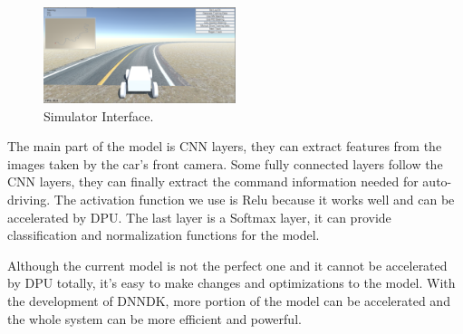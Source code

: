 \documentclass[conference]{IEEEtran}
\begin{document}
\begin{figure}[htbp]
\centerline{\includegraphics[width=0.5\textwidth]{simulator.png}}
\caption{Simulator Interface.}
\label{si}
\end{figure}

The main part of the model is CNN layers, they can extract features from the images taken by the car's front camera. Some fully connected layers follow the CNN layers, they can finally extract the command information needed for auto-driving. The activation function we use is Relu because it works well and can be accelerated by DPU. The last layer is a Softmax layer, it can provide classification and normalization functions for the model.  

Although the current model is not the perfect one and it cannot be accelerated by DPU totally, it's easy to make changes and optimizations to the model. With the development of DNNDK, more portion of the model can be accelerated and the whole system can be more efficient and powerful.
\end{document}

